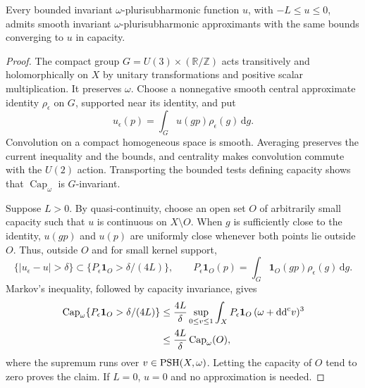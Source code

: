 \begin{lemma}\label{lem:rotational-capacity-smoothing}
Every bounded invariant $\omega$-plurisubharmonic function $u$, with $-L\leq u\leq0$, admits smooth invariant $\omega$-plurisubharmonic approximants with the same bounds converging to $u$ in capacity.
\end{lemma}
\begin{proof}
The compact group $G=U(3)\times(\mathbb R/\mathbb Z)$ acts transitively and holomorphically on $X$ by unitary transformations and positive scalar multiplication. It preserves $\omega$. Choose a nonnegative smooth central approximate identity $\rho_\epsilon$ on $G$, supported near its identity, and put
\[
 u_\epsilon(p)=\int_Gu(gp)\rho_\epsilon(g)\,\mathrm dg.
\]
Convolution on a compact homogeneous space is smooth. Averaging preserves the current inequality and the bounds, and centrality makes convolution commute with the $U(2)$ action. Transporting the bounded tests defining capacity shows that $\operatorname{Cap}_\omega$ is $G$-invariant.

Suppose $L>0$. By quasi-continuity, choose an open set $O$ of arbitrarily small capacity such that $u$ is continuous on $X\setminus O$. When $g$ is sufficiently close to the identity, $u(gp)$ and $u(p)$ are uniformly close whenever both points lie outside $O$. Thus, outside $O$ and for small kernel support,
\[
 \{|u_\epsilon-u|>\delta\}
 \subset\{P_\epsilon\mathbf1_O>\delta/(4L)\},\qquad
 P_\epsilon\mathbf1_O(p)=\int_G\mathbf1_O(gp)\rho_\epsilon(g)\,\mathrm dg.
\]
Markov's inequality, followed by capacity invariance, gives
\[
 \begin{split}
 \operatorname{Cap}_\omega\{P_\epsilon\mathbf1_O>\delta/(4L)\}
 &\leq\frac{4L}{\delta}\sup_{0\leq v\leq1}
       \int_XP_\epsilon\mathbf1_O\,(\omega+\mathrm{dd}^{\mathrm{c}} v)^3\\
 &\leq\frac{4L}{\delta}\operatorname{Cap}_\omega(O),
 \end{split}
\]
where the supremum runs over $v\in\mathrm{PSH}(X,\omega)$. Letting the capacity of $O$ tend to zero proves the claim. If $L=0$, $u=0$ and no approximation is needed.
\end{proof}

